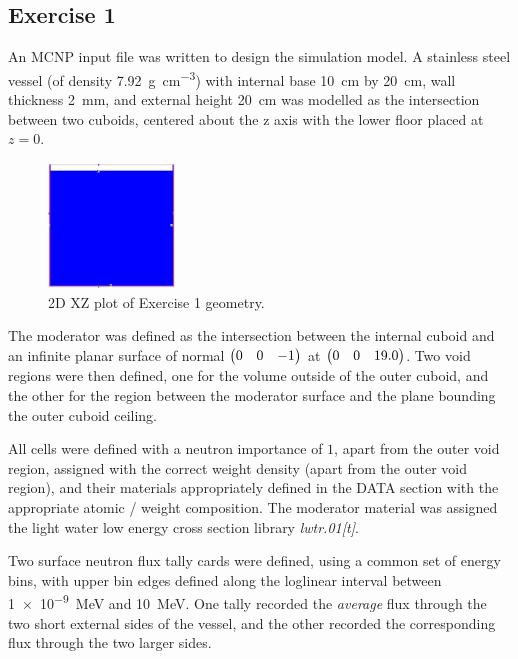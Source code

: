 \documentclass{article}
\begin{document}
  \subsection{Exercise 1}
    \label{sec:ex_1}
    An MCNP input file was written to design the simulation model. A stainless steel vessel (of  density \SI{7.92}{\gram\per\cm^3}) with internal base \SI{10}{\cm} by \SI{20}{\cm}, wall thickness \SI{2}{\mm}, and external height \SI{20}{\cm} was modelled as the intersection between two cuboids, centered about the z axis with the lower floor placed at $z=0$.
    \begin{figure}[htb]
      \centering
      \includegraphics[width=0.3\textwidth]{cuboid.png}
      \caption{2D XZ plot of Exercise 1 geometry.}
      \label{fig:ex_1_geometry}
    \end{figure}
    The moderator was defined as the intersection between the internal cuboid and an infinite planar surface of normal $\mqty(0 & 0 & -1)$ at $\mqty(0 & 0 & 19.0)$. Two void regions were then defined, one for the volume outside of the outer cuboid, and the other for the region between the moderator surface and the plane bounding the outer cuboid ceiling.

    All cells were defined with a neutron importance of $1$, apart from the outer void region, assigned with the correct weight density (apart from the outer void region), and their materials appropriately defined in the DATA section with the appropriate atomic / weight composition. The moderator material was assigned the light water low energy cross section library \textit{lwtr.01[t]}.

    Two surface neutron flux tally cards were defined, using a common set of energy bins, with upper bin edges defined along the log\textendash linear interval between \SI{1e-9}{\MeV} and \SI{10}{\MeV}. One tally recorded the \textit{average} flux through the two short external sides of the vessel, and the other recorded the corresponding flux through the two larger sides.
\end{document}
